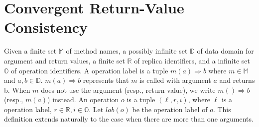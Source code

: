 
\section{Convergent Return-Value Consistency}
\label{sec:specifications and consistencies} 












Given a finite set $\mathbb{M}$ of method names, a possibly infinite set $\mathbb{D}$ of data domain for argument and return values, a finite set $\mathbb{R}$ of replica identifiers, and a infinite set $\mathbb{O}$ of operation identifiers. A operation label is a tuple $m(a)\Rightarrow b$ where $m \in \mathbb{M}$ and $a,b \in \mathbb{D}$. $m(a) \Rightarrow b$ represents that $m$ is called with argument $a$ and returns b. When $m$ does not use the argument (resp., return value), we write $m()\Rightarrow b$ (resp., $m(a)$) instead. An operation $o$ is a tuple $(\ell,r,i)$, where $\ell$ is a operation label, $r \in \mathbb{R},i \in \mathbb{O}$. Let $lab(o)$ be the operation label of $o$. This definition extends naturally to the case when there are more than one arguments. 


